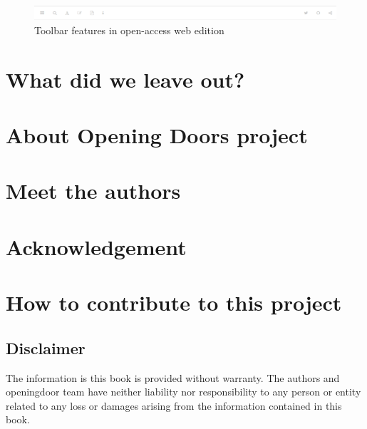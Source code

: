 \documentclass[
]{book}
\begin{document}
\begin{figure}
\centering
\includegraphics{images/toolbarimage.png}
\caption{Toolbar features in open-access web edition}
\end{figure}

\hypertarget{what-did-we-leave-out}{%
\section*{What did we leave out?}\label{what-did-we-leave-out}}

\hypertarget{about-opening-doors-project}{%
\section*{About Opening Doors project}\label{about-opening-doors-project}}

\hypertarget{meet-the-authors}{%
\section*{Meet the authors}\label{meet-the-authors}}

\hypertarget{acknowledgement}{%
\section*{Acknowledgement}\label{acknowledgement}}

\hypertarget{how-to-contribute-to-this-project}{%
\section*{How to contribute to this project}\label{how-to-contribute-to-this-project}}

\hypertarget{disclaimer}{%
\subsection*{Disclaimer}\label{disclaimer}}

The information is this book is provided without warranty. The authors and openingdoor team have neither liability nor responsibility to any person or entity related to any loss or damages arising from the information contained in this book.
\end{document}
